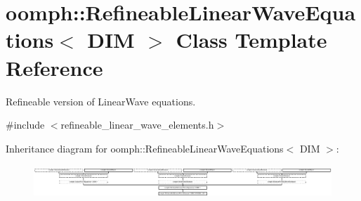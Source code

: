 \hypertarget{classoomph_1_1RefineableLinearWaveEquations}{}\section{oomph\+:\+:Refineable\+Linear\+Wave\+Equations$<$ D\+IM $>$ Class Template Reference}
\label{classoomph_1_1RefineableLinearWaveEquations}


Refineable version of Linear\+Wave equations.  




{\ttfamily \#include $<$refineable\+\_\+linear\+\_\+wave\+\_\+elements.\+h$>$}

Inheritance diagram for oomph\+:\+:Refineable\+Linear\+Wave\+Equations$<$ D\+IM $>$\+:\begin{figure}[H]
\begin{center}
\leavevmode
\includegraphics[height=1.264679cm]{classoomph_1_1RefineableLinearWaveEquations}
\end{center}
\end{figure}
